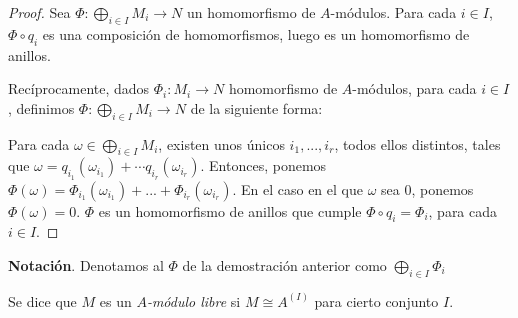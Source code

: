 \documentclass[../main.tex]{subfiles}
\begin{document}
\begin{proof}
Sea $\Phi:\bigoplus_{i\in I} M_i \rightarrow N$ un homomorfismo de $A$-módulos. Para cada $i\in I$, $\Phi \circ q_i$ es una composición de homomorfismos, luego es un homomorfismo de anillos.

Recíprocamente, dados $\Phi_i:M_i\rightarrow N$ homomorfismo de $A$-módulos, para cada $i\in I$, definimos $\Phi:\bigoplus_{i\in I} M_i\rightarrow N$ de la siguiente forma:

Para cada $\omega \in \bigoplus_{i\in I} M_i$, existen unos únicos $i_1,...,i_r$, todos ellos distintos, tales que $\omega=q_{i_1}(\omega_{i_1})+\cdots q_{i_r}(\omega_{i_r})$. Entonces, ponemos $\Phi(\omega)=\Phi_{i_1}(\omega_{i_1})+...+\Phi_{i_r}(\omega_{i_r})$. En el caso en el que $\omega$ sea $0$, ponemos $\Phi(\omega)=0$. $\Phi$ es un homomorfismo de anillos que cumple $\Phi\circ q_i = \Phi_i$, para cada $i\in I$.
\end{proof}

\textbf{Notación}. Denotamos al $\Phi$ de la demostración anterior como $\bigoplus_{i\in I} \Phi_i$

\begin{definition}
  Se dice que $M$ es un \textit{$A$-módulo libre} si $M \cong A^{(I)}$ para cierto conjunto $I$.
\end{definition}
\end{document}
